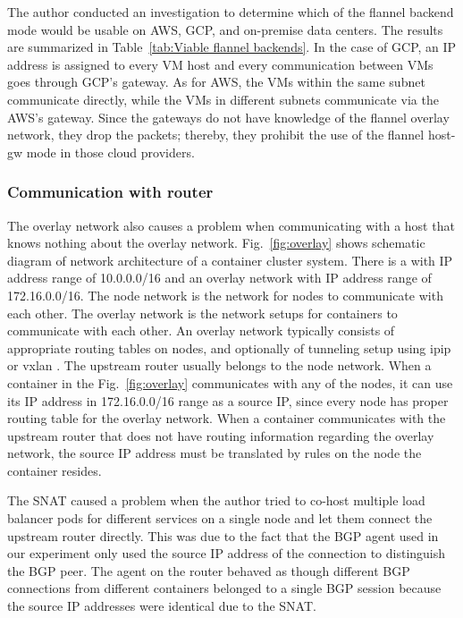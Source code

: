 The author conducted an investigation to determine which of the flannel backend mode would be usable on AWS, GCP, and on-premise data centers.
The results are summarized in Table~\ref{tab:Viable flannel backends}. 
In the case of GCP, an IP address  is assigned to every VM host and every communication between VMs goes through GCP's gateway.
As for AWS, the VMs within the same subnet communicate directly, while the VMs in different subnets communicate via the AWS's gateway.
Since the gateways do not have knowledge of the flannel overlay network, they drop the packets; thereby, 
they prohibit the use of the flannel host-gw mode in those cloud providers.  

\subsubsection{Communication with router}

The overlay network also causes a problem when communicating with a host that knows nothing about the overlay network.
Fig.~\ref{fig:overlay} shows schematic diagram of network architecture of a container cluster system. 
There is a  with  IP address range of 10.0.0.0/16 and an overlay network with  IP address range of 172.16.0.0/16.
The node network is the network for nodes to communicate with each other.
The overlay network is the network setups for containers to communicate with each other.
An overlay network typically consists of appropriate routing tables on nodes, and optionally of tunneling setup using ipip \cite{kuznetsov1999tunnels} or vxlan \cite{zismer2016performance}.
The upstream router usually belongs to the node network.
When a container in the Fig.~\ref{fig:overlay} communicates with any of the nodes, it can use its IP address in 172.16.0.0/16 range as a source IP, since every node has proper routing table for the overlay network.
When a container communicates with the upstream router that does not have routing information regarding the overlay network, the source IP address must be translated by  rules on the node  the container resides.

The SNAT caused a problem when the author tried to co-host multiple load balancer pods for different services on a single node and let them connect the upstream router directly.
This was due to the fact that the BGP agent used in our experiment only used the source IP address of the connection to distinguish the BGP peer.
The agent on the router behaved as though different BGP connections from different containers belonged to a single BGP session because the source IP addresses were identical due to the SNAT.

